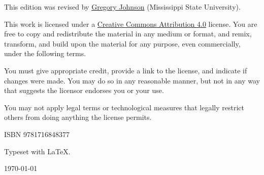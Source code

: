 \noindent This edition was revised by \href{http://loighic.net/}{Gregory Johnson} (Mississippi State University). %


\bigskip
\bigskip

\noindent \footnotesize This work is licensed under a \href{https://creativecommons.org/licenses/by/4.0/}{Creative Commons Attribution 4.0} license. 
You are free to copy and redistribute the material in any medium or format, and  remix, transform, and build upon the material for any purpose, even commercially, under the following terms.
\smallskip

\noindent You must give appropriate credit, provide a link to the license, and indicate if changes were made. You may do so in any reasonable manner, but not in any way that suggests the licensor endorses you or your use.
\smallskip

\noindent You may not apply legal terms or technological measures that legally restrict others from doing anything the license permits.

\normalsize 

\bigskip

\begin{center}
ISBN 9781716848377
\medskip

Typeset with \LaTeX.
\medskip

\today
\end{center}




